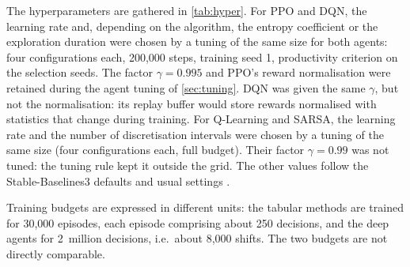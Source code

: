 \documentclass[11pt,a4paper]{article}
\newif\ifrevmarks
\newcommand{\revtag}[1]{\ifrevmarks\textsuperscript{\textcolor{red!70!black}{\scriptsize[#1]}}\fi}
\newenvironment{revbloc}[1]{\par\ifrevmarks\color{revcolor}\noindent\revtag{#1}\ \fi}{\par}
\begin{document}
\begin{revbloc}{M12, v3}
The hyperparameters are gathered in \cref{tab:hyper}. For PPO and DQN, the learning rate and, depending on the algorithm, the entropy coefficient or the exploration duration were chosen by a tuning of the same size for both agents: four configurations each, 200{,}000 steps, training seed 1, productivity criterion on the selection seeds. The factor $\gamma = 0.995$ and PPO's reward normalisation were retained during the agent tuning of \cref{sec:tuning}. DQN was given the same $\gamma$, but not the normalisation: its replay buffer would store rewards normalised with statistics that change during training. For Q-Learning and SARSA, the learning rate and the number of discretisation intervals were chosen by a tuning of the same size (four configurations each, full budget). Their factor $\gamma = 0.99$ was not tuned: the tuning rule kept it outside the grid. The other values follow the Stable-Baselines3 defaults and usual settings \cite{JohnSchulman2017, Mnih2015}.

Training budgets are expressed in different units: the tabular methods are trained for 30{,}000 episodes, each episode comprising about 250 decisions, and the deep agents for 2~million decisions, i.e.\ about 8{,}000 shifts. The two budgets are not directly comparable.
\end{revbloc}
\end{document}
